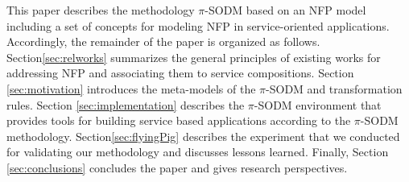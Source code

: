 
 This paper describes the methodology $\pi$-SODM based on  an NFP model including a set of concepts  for  modeling  NFP in service-oriented applications.
Accordingly, the remainder of the paper is organized as follows.
Section\ref{sec:relworks} summarizes the general principles of existing works for addressing NFP and associating them to service compositions. Section \ref{sec:motivation} introduces the meta-models of the $\pi$-SODM and transformation rules. Section \ref{sec:implementation} describes the $\pi$-SODM environment that provides tools for building service based applications according to the $\pi$-SODM methodology. Section\ref{sec:flyingPig} describes the experiment that we conducted for validating our methodology and discusses lessons learned. Finally, Section \ref{sec:conclusions} concludes the paper and gives research perspectives.






